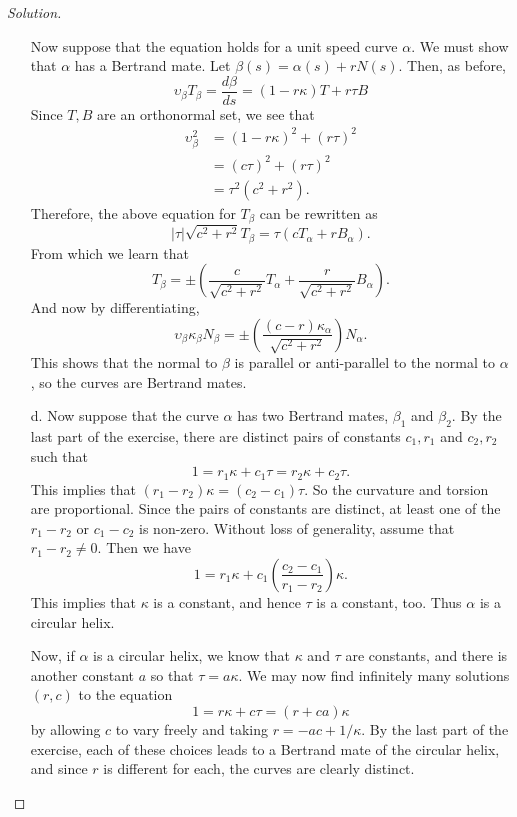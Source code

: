 \documentclass[Shifrin_Solutions_Spring_2018]{subfiles}
\begin{document}
\begin{proof}[Solution]
\begin{itemize}
Now suppose that the equation holds for a unit speed curve $\alpha$. We must show 
that $\alpha$ has a Bertrand mate. Let $\beta(s) = \alpha(s) + r N(s)$.
Then, as before,
\[
\upsilon_{\beta} T_{\beta} = \dfrac{d\beta}{ds} = (1 - r\kappa) T + r\tau B
\]
Since $T, B$ are an orthonormal set, we see that
\[
\begin{split}
\upsilon_{\beta}^2 & =  (1-r\kappa)^2 + (r\tau)^2 \\
	& = (c\tau)^2 + (r\tau)^2 \\
	& = \tau^2 (c^2+r^2) .
\end{split}
\]
Therefore, the above equation for $T_{\beta}$ can be rewritten as
\[
|\tau| \sqrt{c^2+r^2} T_{\beta} = \tau (cT_{\alpha} + r B_{\alpha} ).
\]
From which we learn that
\[
T_{\beta} = \pm \left( \dfrac{c}{\sqrt{c^2+r^2}} T_{\alpha} 
+ \dfrac{r}{ \sqrt{c^2+r^2} } B_{\alpha} \right) .
\]
And now by differentiating,
\[
\upsilon_{\beta} \kappa_{\beta} N_{\beta} = 
\pm \left(  \dfrac{ (c-r) \kappa_{\alpha} }{ \sqrt{c^2+r^2} } \right) N_{\alpha}.
\]
This shows that the normal to $\beta$ is parallel or anti-parallel to the normal to 
$\alpha$, so the curves are Bertrand mates.


\item[d.]  Now suppose that the curve $\alpha$ has two Bertrand mates, $\beta_1$ and 
$\beta_2$. By the last part of the exercise, there are distinct pairs of constants 
$c_1,  r_1$ and $c_2, r_2$ such that
\[
1 = r_1 \kappa + c_1 \tau = r_2 \kappa + c_2 \tau .
\]
This implies that $ (r_1 - r_2) \kappa = (c_2 - c_1) \tau $. So the curvature and 
torsion are proportional. Since the pairs of constants are distinct, at least one 
of the $r_1-r_2$ or $c_1-c_2$ is non-zero. Without loss of generality, assume that 
$r_1-r_2 \neq 0$. Then we have
\begin{equation*}\label{eq:ex1-2-19}
1 = r_1 \kappa + c_1 \left( \dfrac{c_2 - c_1}{r_1-r_2}\right) \kappa .
\end{equation*}
This implies that $\kappa$ is a constant, and hence $\tau$ is a constant, too.  
Thus $\alpha$ is a circular helix.

Now, if $\alpha$ is a circular helix, we know that $\kappa$ and $\tau$ are constants, 
and there is another constant $a$ so that $\tau = a\kappa$. We may now find 
infinitely many solutions $(r,c)$ to the equation
\[
1 = r\kappa + c\tau = (r+ca) \kappa
\]
by allowing $c$ to vary freely and taking $r = -ac + 1/\kappa$. By the last part 
of the exercise, each of these choices leads to a Bertrand mate of the circular 
helix, and since $r$ is different for each, the curves are clearly distinct.
\end{itemize}
\end{proof}
\end{document}
